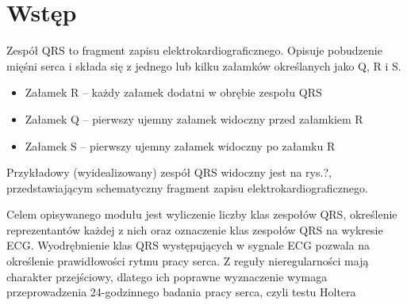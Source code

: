 \section{Wstęp}

Zespół QRS to fragment zapisu elektrokardiograficznego. Opisuje pobudzenie mięśni serca i składa się z jednego lub kilku załamków określanych jako Q, R i S.
\begin{itemize}
	\item Załamek R – każdy załamek dodatni w obrębie zespołu QRS
	\item Załamek Q – pierwszy ujemny załamek widoczny przed załamkiem R
	\item Załamek S – pierwszy ujemny załamek widoczny po załamku R
\end{itemize}
Przykładowy (wyidealizowany) zespół QRS widoczny jest na rys.?, przedstawiającym schematyczny fragment zapisu elektrokardiograficznego.

Celem opisywanego modułu jest wyliczenie liczby klas zespołów QRS, określenie reprezentantów każdej z nich oraz oznaczenie klas zespołów QRS na wykresie ECG. Wyodrębnienie klas QRS występujących w sygnale ECG pozwala na określenie prawidłowości rytmu pracy serca. Z reguły nieregularności mają charakter przejściowy, dlatego ich poprawne wyznaczenie wymaga przeprowadzenia 24-godzinnego badania pracy serca, czyli testu Holtera